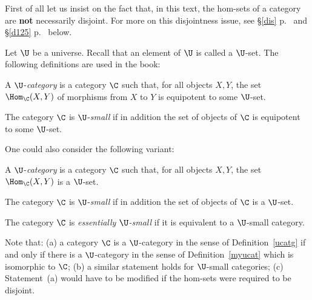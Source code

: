 \documentclass[12pt]{article}
\theoremstyle{remark}
\theoremstyle{definition}
\begin{document}
\begin{s}
First of all let us insist on the fact that, in this text, the hom-sets of a category are \textbf{not} necessarily disjoint. For more on this disjointness issue, see \S\ref{dis} p.~\pageref{dis} and \S\ref{d125} p.~\pageref{d125} below. %
\end{s}

Let $\U$ be a universe. Recall that an element of $\U$ is called a $\U$-set. The following definitions are used in the book: 

\begin{df}[$\U$-category] 
A $\U$-{\em category} is a category $\C$ such that, for all objects $X,Y$, the set $\Hom_\C(X,Y)$ of morphisms from $X$ to $Y$ is equipotent to some $\U$-set. 
\end{df} 

\begin{df} 
The category $\C$ is $\U$-{\em small} if in addition the set of objects of $\C$ is equipotent to some $\U$-set. 
\end{df} 

One could also consider the following variant: 

\begin{df}[$\U$-category] 
A $\U$-{\em category} is a category $\C$ such that, for all objects $X,Y$, the set $\Hom_\C(X,Y)$ is a $\U$-set. 
\end{df} 

\begin{df}
The category $\C$ is $\U$-{\em small} if in addition the set of objects of $\C$ is a $\U$-set. 
\end{df}

\begin{df}
The category $\C$ is \emph{essentially $\U$-small} if it is equivalent to a $\U$-small category. 
\end{df} 

Note that: (a) a category $\C$ is a $\U$-category in the sense of Definition~\ref{ucatg} if and only if there is a $\U$-category in the sense of Definition~\ref{myucat} which is isomorphic to $\C$; (b) a similar statement holds for $\U$-small categories; (c) Statement~(a) would have to be modified if the hom-sets were required to be disjoint. 
\begin{center}
\end{center}
\end{document}
